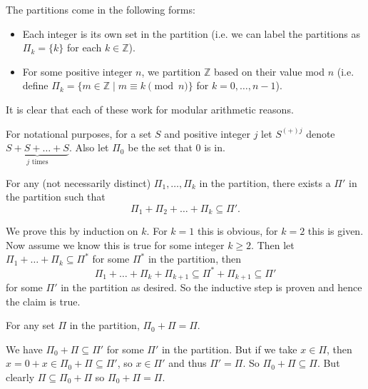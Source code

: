 The partitions come in the following forms:
\begin{itemize}
	\item Each integer is its own set in the partition (i.e. we can label the partitions as $\Pi_k=\{k\}$ for each $k\in\mathbb{Z}$).
	\item For some positive integer $n$, we partition $\mathbb{Z}$ based on their value mod $n$ (i.e. define $\Pi_k=\{m\in\mathbb{Z}\mid m\equiv k\pmod n\}$ for $k=0,\ldots,n-1$).
\end{itemize}
It is clear that each of these work for modular arithmetic reasons.

For notational purposes, for a set $S$ and positive integer $j$ let $S^{(+)j}$ denote $\underbrace{S+S+\ldots+S}_{j\text{ times}}$. Also let $\Pi_0$ be the set that $0$ is in.

\begin{claim}
	For any (not necessarily distinct) $\Pi_1,\ldots,\Pi_k$ in the partition, there exists a $\Pi'$ in the partition such that
	\[
		\Pi_1+\Pi_2+\ldots+\Pi_k\subseteq\Pi'.
	\]
\end{claim}
\begin{lemmaproof}
	We prove this by induction on $k$. For $k=1$ this is obvious, for $k=2$ this is given. Now assume we know this is true for some integer $k\geq2$. Then let $\Pi_1+\ldots+\Pi_k\subseteq\Pi^*$ for some $\Pi^*$ in the partition, then
	\[
		\Pi_1+\ldots+\Pi_k+\Pi_{k+1}\subseteq\Pi^*+\Pi_{k+1}\subseteq\Pi'
	\]
	for some $\Pi'$ in the partition as desired. So the inductive step is proven and hence the claim is true.
\end{lemmaproof}

\begin{claim}
	For any set $\Pi$ in the partition, $\Pi_0+\Pi=\Pi$.
\end{claim}
\begin{lemmaproof}
	We have $\Pi_0+\Pi\subseteq\Pi'$ for some $\Pi'$ in the partition. But if we take $x\in\Pi$, then $x=0+x\in\Pi_0+\Pi\subseteq\Pi'$, so $x\in\Pi'$ and thus $\Pi'=\Pi$. So $\Pi_0+\Pi\subseteq\Pi$. But clearly $\Pi\subseteq\Pi_0+\Pi$ so $\Pi_0+\Pi=\Pi$.
\end{lemmaproof}

